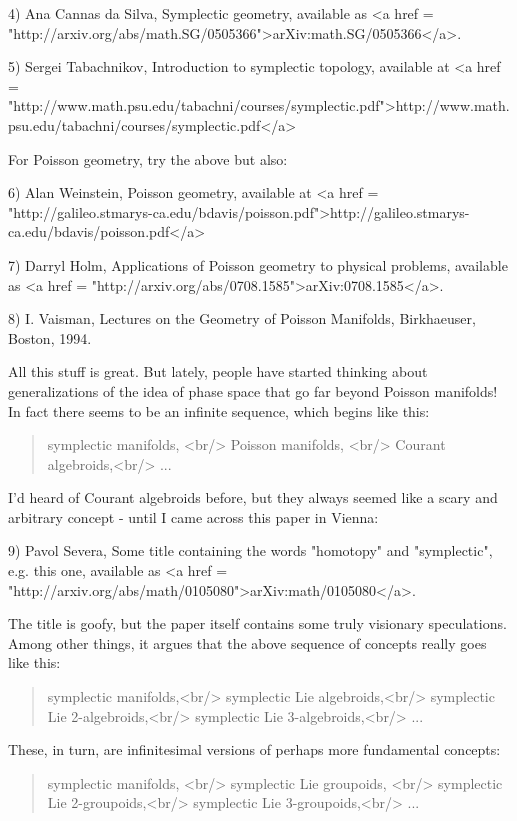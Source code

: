 4) Ana Cannas da Silva, Symplectic geometry, available as 
<a href = "http://arxiv.org/abs/math.SG/0505366">arXiv:math.SG/0505366</a>.

5) Sergei Tabachnikov, Introduction to symplectic topology, 
available at <a href = "http://www.math.psu.edu/tabachni/courses/symplectic.pdf">http://www.math.psu.edu/tabachni/courses/symplectic.pdf</a>

For Poisson geometry, try the above but also:

6) Alan Weinstein, Poisson geometry, available at
<a href = "http://galileo.stmarys-ca.edu/bdavis/poisson.pdf">http://galileo.stmarys-ca.edu/bdavis/poisson.pdf</a>

7) Darryl Holm, Applications of Poisson geometry to physical 
problems, available as <a href = "http://arxiv.org/abs/0708.1585">arXiv:0708.1585</a>.

8) I. Vaisman, Lectures on the Geometry of Poisson Manifolds, 
Birkhaeuser, Boston, 1994.

All this stuff is great.  But lately, people have started thinking 
about generalizations of the idea of phase space that go far beyond 
Poisson manifolds!  In fact there seems to be an infinite sequence,
which begins like this:

\begin{quote}
 symplectic manifolds, <br/>
 Poisson manifolds, <br/>
 Courant algebroids,<br/>
 ...
\end{quote}
    

I'd heard of Courant algebroids before, but they always seemed
like a scary and arbitrary concept - until I came across this 
paper in Vienna:


 9) Pavol Severa, Some title containing the words
"homotopy" and "symplectic", e.g. this one,
available as <a href =
"http://arxiv.org/abs/math/0105080">arXiv:math/0105080</a>.

The title is goofy, but the paper itself contains some truly
visionary speculations.  Among other things, it argues that the 
above sequence of concepts really goes like this:
 
\begin{quote}
 symplectic manifolds,<br/>
 symplectic Lie algebroids,<br/>
 symplectic Lie 2-algebroids,<br/>
 symplectic Lie 3-algebroids,<br/>
 ...
\end{quote}
    

These, in turn, are infinitesimal versions of perhaps more fundamental
concepts:

\begin{quote}
 symplectic manifolds, <br/>
 symplectic Lie groupoids, <br/>
 symplectic Lie 2-groupoids,<br/>
 symplectic Lie 3-groupoids,<br/>
 ...
\end{quote}
    

